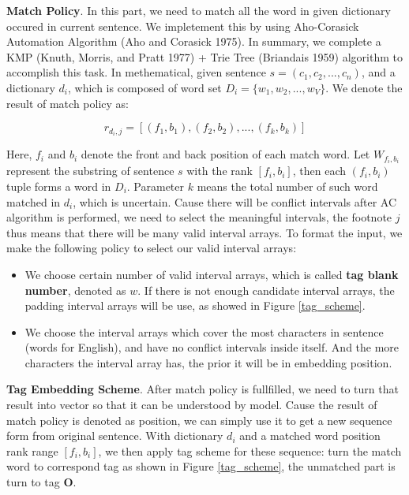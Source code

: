\documentclass[letterpaper]{article} %
\begin{document}
\textbf{Match Policy}. In this part, we need to match all the word in given dictionary occured in current sentence. We impletement this by using Aho-Corasick Automation Algorithm (Aho and Corasick 1975). In summary, we complete a KMP (Knuth, Morris, and Pratt 1977) + Trie Tree (Briandais 1959) algorithm to accomplish this task. In methematical, given sentence $s = (c_1, c_2, ..., c_n) $, and a dictionary $d_i$, which is composed of word set $D_i=\{w_1, w_2, ..., w_V\}$. We denote the result of match policy as:

\begin{equation}
r_{d_i, j} = [ (f_1, b_1), (f_2 , b_2), ..., (f_k, b_k) ] \label{match_result}
\end{equation}

Here, $f_i$ and $b_i$ denote the front and back position of each match word. Let $W_{f_i,b_i}$ represent the substring of sentence $s$ with the rank $[f_i, b_i]$, then each $(f_i, b_i)$ tuple forms a word in $D_i$. Parameter $k$ means the total number of such word matched in $d_i$, which is uncertain. Cause there will be conflict intervals after AC algorithm is performed, we need to select the meaningful intervals, the footnote $j$ thus means that there will be many valid interval arrays. To format the input, we make the following policy to select our valid interval arrays:

\begin{itemize}
\item We choose certain number of valid interval arrays, which is called \textbf{tag blank number}, denoted as $w$. If there is not enough candidate interval arrays, the padding interval arrays will be use, as showed in Figure \ref{tag_scheme}. 
\item We choose the interval arrays which cover the most characters in sentence (words for English), and have no conflict intervals inside itself. And the more characters the interval array has, the prior it will be in embedding position.
\end{itemize}

\textbf{Tag Embedding Scheme}. After match policy is fullfilled, we need to turn that result into vector so that it can be understood by model. Cause the result of match policy is denoted as position, we can simply use it to get a new sequence form from original sentence. With dictionary $d_i$ and a matched word position rank range $[f_i, b_i]$, we then apply tag scheme for these sequence: turn the match word to correspond tag as shown in Figure \ref{tag_scheme}, the unmatched part is turn to tag \textbf{O}.
\end{document}
